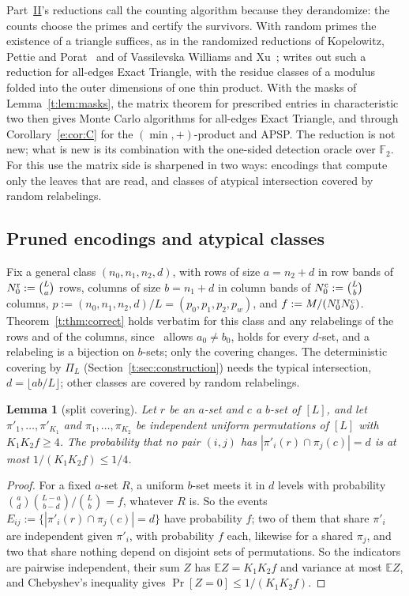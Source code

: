 \documentclass[11pt]{article}
\newtheorem{lemma}[theorem]{Lemma}
\theoremstyle{definition}
\theoremstyle{remark}
\newcommand{\F}{\mathbb{F}_2}
\newcommand{\Nz}{N_0}
\begin{document}
Part~\hyperref[m:partII]{II}'s reductions call the counting algorithm because they derandomize: the counts choose the primes and certify the survivors. With random primes the existence of a triangle suffices, as in the randomized reductions of Kopelowitz, Pettie and Porat~\cite{KPP16} and of Vassilevska Williams and Xu~\cite{VX20}; \cite[Theorem~9]{Shr26} writes out such a reduction for all-edges Exact Triangle, with the residue classes of a modulus folded into the outer dimensions of one thin product. With the masks of Lemma~\ref{t:lem:masks}, the matrix theorem for prescribed entries in characteristic two then gives Monte Carlo algorithms for all-edges Exact Triangle, and through Corollary~\ref{e:cor:C} for the $(\min,+)$-product and APSP. The reduction is not new; what is new is its combination with the one-sided detection oracle over $\F$. For this use the matrix side is sharpened in two ways: encodings that compute only the leaves that are read, and classes of atypical intersection covered by random relabelings.

\subsection{Pruned encodings and atypical classes}\label{t:sec:pruned}

Fix a general class $(n_0,n_1,n_2,d)$, with rows of size $a=n_2+d$ in row bands of $\Nz^{\rm r}:=\binom La$ rows, columns of size $b=n_1+d$ in column bands of $\Nz^{\rm c}:=\binom Lb$ columns, $p:=(n_0,n_1,n_2,d)/L=(p_0,p_1,p_2,p_w)$, and $f:=M/(\Nz^{\rm r}\Nz^{\rm c})$. Theorem~\ref{t:thm:correct} holds verbatim for this class and any relabelings of the rows and of the columns, since~\cite[Lemma~3.1]{Maj26b} allows $a_0\ne b_0$, \cite[Proposition~3.2]{Maj26b} holds for every $d$-set, and a relabeling is a bijection on $b$-sets; only the covering changes. The deterministic covering by $\Pi_L$ (Section~\ref{t:sec:construction}) needs the typical intersection, $d=\lfloor ab/L\rfloor$; other classes are covered by random relabelings.

\begin{lemma}[split covering]\label{t:lem:split}
Let $r$ be an $a$-set and $c$ a $b$-set of $[L]$, and let $\pi'_1,\dots,\pi'_{K_1}$ and $\pi_1,\dots,\pi_{K_2}$ be independent uniform permutations of $[L]$ with $K_1K_2f\ge4$. The probability that no pair $(i,j)$ has $|\pi'_i(r)\cap\pi_j(c)|=d$ is at most $1/(K_1K_2f)\le1/4$.
\end{lemma}

\begin{proof}
For a fixed $a$-set $R$, a uniform $b$-set meets it in $d$ levels with probability $\binom ad\binom{L-a}{b-d}/\binom Lb=f$, whatever $R$ is. So the events $E_{ij}:=\{|\pi'_i(r)\cap\pi_j(c)|=d\}$ have probability $f$; two of them that share $\pi'_i$ are independent given $\pi'_i$, with probability $f$ each, likewise for a shared $\pi_j$, and two that share nothing depend on disjoint sets of permutations. So the indicators are pairwise independent, their sum $Z$ has $\mathbb EZ=K_1K_2f$ and variance at most $\mathbb EZ$, and Chebyshev's inequality gives $\Pr[Z=0]\le1/(K_1K_2f)$.
\end{proof}
\end{document}

